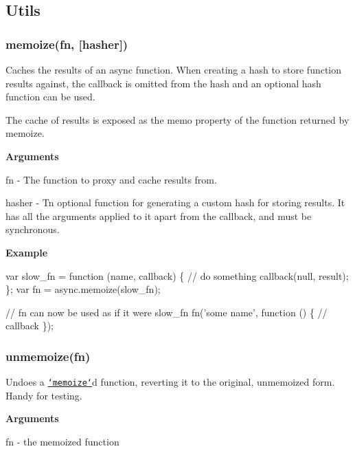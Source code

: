 \subsection*{Utils}

\label{_memoize}%
 \subsubsection*{memoize(fn, \mbox{[}hasher\mbox{]})}

Caches the results of an {\ttfamily async} function. When creating a hash to store function results against, the callback is omitted from the hash and an optional hash function can be used.

The cache of results is exposed as the {\ttfamily memo} property of the function returned by {\ttfamily memoize}.

{\bfseries Arguments}


\begin{DoxyItemize}
\item {\ttfamily fn} -\/ The function to proxy and cache results from.
\item {\ttfamily hasher} -\/ Tn optional function for generating a custom hash for storing results. It has all the arguments applied to it apart from the callback, and must be synchronous.
\end{DoxyItemize}

{\bfseries Example}


\begin{DoxyCode}
var slow\_fn = \textcolor{keyword}{function} (name, callback) \{
    \textcolor{comment}{// do something}
    callback(null, result);
\};
var fn = async.memoize(slow\_fn);

\textcolor{comment}{// fn can now be used as if it were slow\_fn}
fn(\textcolor{stringliteral}{'some name'}, \textcolor{keyword}{function} () \{
    \textcolor{comment}{// callback}
\});
\end{DoxyCode}


\label{_unmemoize}%
 \subsubsection*{unmemoize(fn)}

Undoes a \href{#memoize}{\tt `memoize`}d function, reverting it to the original, unmemoized form. Handy for testing.

{\bfseries Arguments}


\begin{DoxyItemize}
\item {\ttfamily fn} -\/ the memoized function
\end{DoxyItemize}

